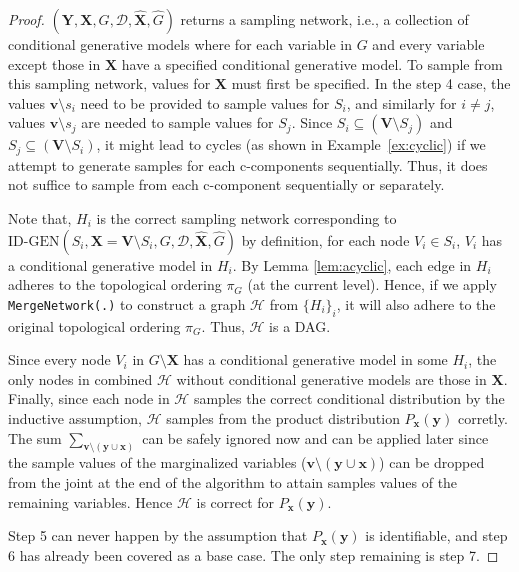 \documentclass{article}
\newcommand{\x}{\mathbf{x}}
\newcommand{\y}{\mathbf{y}}
\newcommand{\X}{\mathbf{X}}
\newcommand{\Xp}{{\hat{\mathbf{X}}}}
\newcommand{\Gp}{{\hat{{G}}}}
\newcommand{\V}{\mathbf{V}}
\newcommand{\vb}{\mathbf{v}}
\newcommand{\data}{\mathcal{D}}
\newcommand{\idgen}{\text{ID-GEN}\xspace}
\newcommand{\idmerge}{\texttt{MergeNetwork(.)}\xspace}
\newcommand{\idgenpar}{\idgen$(\mathbf{Y}, \mathbf{X},  G,  \data, {\Xp}, \Gp)$\xspace}
\theoremstyle{plain}
\theoremstyle{definition}
\theoremstyle{remark}
\begin{document}
\begin{proof}
		\idgenpar returns a sampling network, i.e., a collection of conditional generative models where for each variable in $G$ and every variable %
		except those in $\X$ have a specified conditional generative model. To sample from this sampling network, values for $\X$ must first be specified. In the step 4 case, the values $\vb \setminus s_i$ need to be provided to sample values for $S_i$, and similarly for $i\neq j$, values $\vb \setminus s_j$ are needed to sample values for $S_j$. Since $S_i\subseteq (\V \setminus S_j)$ and $S_j\subseteq (\V \setminus S_i)$, it might lead to cycles (as shown in Example~\ref{ex:cyclic})
  if we attempt to generate samples for each c-components sequentially.
  Thus, it does not suffice to sample from each c-component sequentially or separately.
		
Note that, $H_i$ is the correct sampling network corresponding to 
		$\idgen(S_{i}, \mathbf{X}=\mathbf{V} \setminus S_{i}, G,  \data, {\Xp}, \Gp)$
		by definition, for each node $V_i\in S_i$, $V_i$ has a conditional generative model in $H_i$. By Lemma \ref{lem:acyclic}, each edge in $H_i$ adheres to the topological ordering $\pi_G$ (at the current level). Hence, if we apply \idmerge to construct a graph $\mathcal{H}$ from $\{H_i\}_i$, it will also adhere to the original topological ordering $\pi_G$. Thus, $\mathcal{H}$ is a DAG. 
  
  Since every node $V_i$ in $G\setminus \X$ has a conditional generative model in some $H_i$,
  the only nodes in combined $\mathcal{H}$ without conditional generative models are those in $\X$.
  Finally, since each node in $\mathcal{H}$ samples the correct conditional distribution by the inductive assumption, $\mathcal{H}$ samples from the product distribution $P_{\x}(\y)$ corretly. The sum $\sum_{\vb\setminus(\y\cup \x)}$ can be safely ignored now and can be applied later since the sample values of the marginalized variables ($\vb\setminus(\y\cup \x)$) can be dropped from the joint at the end of the algorithm to attain samples values of the remaining variables. Hence $\mathcal{H}$ is correct for $P_{\x}(\y)$.
		
		Step 5 can never happen by the %
		assumption that $P_{\x}(\y)$ is identifiable, and step 6 has already been covered as a base case. The only step remaining is step 7. 



\end{proof}
\end{document}
